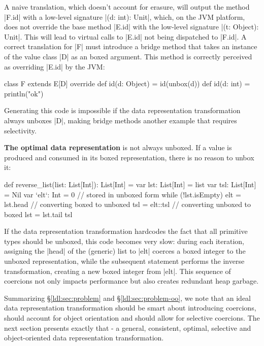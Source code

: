 A naive translation, which doesn't account for erasure, will output the method |F.id| with a low-level signature |(d: int): Unit|, which, on the JVM platform, does not override the base method |E.id| with the low-level signature |(t: Object): Unit|. This will lead to virtual calls to |E.id| not being dispatched to |F.id|. A correct translation for |F| must introduce a bridge method that takes an instance of the value class |D| as an boxed argument. This method is correctly perceived as overriding |E.id| by the JVM:

\begin{lstlisting-nobreak}
 class F extends E[D] {
   override def id(d: Object) = id(unbox(d))
   def id(d: int) = println("ok")
 }
\end{lstlisting-nobreak}

Generating this code is impossible if the data representation transformation always unboxes |D|, making bridge methods another example that requires selectivity.

\textbf{The optimal data representation} is not always unboxed. If a value is produced and consumed in its boxed representation, there is no reason to unbox it:

\begin{lstlisting-nobreak}
 def reverse_list(list: List[Int]): List[Int] = {
   var lst: List[Int] = list
   var tsl: List[Int] = Nil
   var `elt`: Int = 0 // stored in unboxed form
   while (!lst.isEmpty) {
     elt = lst.head // converting boxed to unboxed
     tsl = elt::tsl // converting unboxed to boxed
     lst = lst.tail
   }
   tsl
 }
\end{lstlisting-nobreak}

If the data representation transformation hardcodes the fact that all primitive types should be unboxed, this code becomes very slow: during each iteration, assigning the |head| of the (generic) list to |elt| coerces a boxed integer to the unboxed representation, while the subsequent statement performs the inverse transformation, creating a new boxed integer from |elt|. This sequence of coercions not only impacts performance but also creates redundant heap garbage.

Summarizing \S\ref{ldl:sec:problem} and \S\ref{ldl:sec:problem-oo}, we note that an ideal data representation transformation should be smart about introducing coercions, should account for object orientation and should allow for selective coercions. The next section presents exactly that - a general, consistent, optimal, selective and object-oriented data representation transformation.

